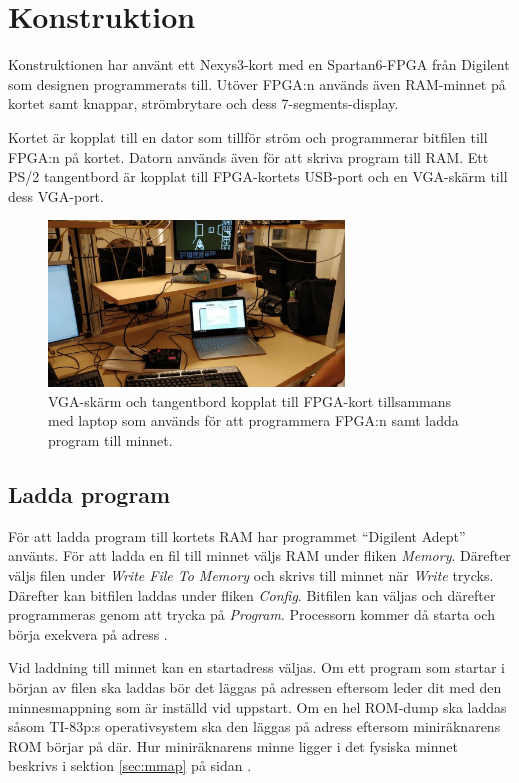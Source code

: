 \documentclass[main.tex]{subfiles}
\begin{document}
\clearpage
\section{Konstruktion}
Konstruktionen har använt ett Nexys3-kort med en Spartan6-FPGA från Digilent
som designen programmerats till. Utöver FPGA:n används även RAM-minnet på
kortet samt knappar, strömbrytare och dess 7-segments-display.

Kortet är kopplat till en dator som tillför ström och programmerar bitfilen
till FPGA:n på kortet. Datorn används även för att skriva program till RAM.
Ett PS/2 tangentbord är kopplat till FPGA-kortets USB-port och en VGA-skärm
till dess VGA-port.  

\begin{figure}
    \centering
    \includegraphics[width=0.7\textwidth,bb=0 0 1152 648]{img/setup_small.jpg}
    \caption{VGA-skärm och tangentbord kopplat till FPGA-kort tillsammans med
    laptop som används för att programmera FPGA:n samt ladda program till
    minnet.}
\end{figure}

\subsection{Ladda program}
För att ladda program till kortets RAM har programmet ``Digilent Adept''
använts. För att ladda en fil till minnet väljs RAM under fliken {\it Memory}.
Därefter väljs filen under {\it Write File To Memory} och skrivs till minnet
när {\it Write} trycks. Därefter kan bitfilen laddas under fliken {\it Config}.
Bitfilen kan väljas och därefter programmeras genom att trycka på {\it
Program}. Processorn kommer då starta och börja exekvera på adress
.

Vid laddning till minnet kan en startadress väljas. Om ett program som startar
i början av filen ska laddas bör det läggas på adressen  eftersom
 leder dit med den minnesmappning som är inställd vid uppstart. Om
en hel ROM-dump ska laddas såsom TI-83p:s operativsystem ska den läggas på
adress  eftersom miniräknarens ROM börjar på där. Hur
miniräknarens minne ligger i det fysiska minnet beskrivs i sektion
\ref{sec:mmap} på sidan \pageref{sec:mmap}.
\end{document}
